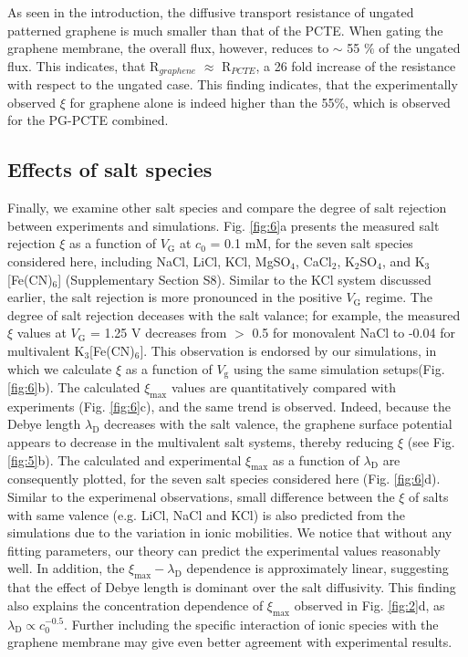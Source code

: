 \documentclass[journal=langd5,email=true, hyperref=true, keywords=false]{achemso}
\newcommand{\Fig}{Fig.}
\begin{document}
As seen in the introduction, the diffusive transport resistance of ungated patterned graphene 
is much smaller than that of the PCTE. When gating the graphene membrane,
the overall flux, however, reduces to $\sim$ 55 $\%$
of the ungated flux. This indicates, that R$_{graphene}$ $\approx$ R$_{PCTE}$, 
a 26 fold increase of the resistance with respect to the ungated case. 
This finding indicates, that the experimentally observed $\xi$ for graphene alone 
is indeed higher than the 55$\%$, which is observed for the PG-PCTE combined.

\subsection{Effects of salt species}
\label{sec:salts}

Finally, we examine other salt species and compare the degree of salt
rejection between experiments and simulations. \Fig{} \ref{fig:6}a
presents the measured salt rejection $\xi$ as a function of
$V_{\mathrm{G}}$ at $c_{0}$ = 0.1 mM, for the seven salt species
considered here, including NaCl, LiCl, KCl, MgSO$_{4}$, CaCl$_{2}$,
K$_{2}$SO$_{4}$, and K$_{3}$[Fe(CN)$_{6}$] (Supplementary Section
S8). Similar to the KCl system discussed earlier, the salt rejection
is more pronounced in the positive $V_{\mathrm{G}}$ regime. The degree
of salt rejection deceases with the salt valance; for example, the
measured $\xi$ values at $V_{\mathrm{G}}$ = 1.25 V decreases from $>$
0.5 for monovalent NaCl to -0.04 for multivalent
K$_{3}$[Fe(CN)$_{6}$]. This observation is endorsed by our
simulations, in which we calculate $\xi$ as a function of
$V_{\mathrm{g}}$ using the same simulation setups(\Fig{}
\ref{fig:6}b). The calculated $\xi_{\mathrm{max}}$ values are
quantitatively compared with experiments (\Fig{} \ref{fig:6}c), and
the same trend is observed. Indeed, because the Debye length
$\lambda_{\mathrm{D}}$ decreases with the salt valence, the graphene
surface potential appears to decrease in the multivalent salt systems,
thereby reducing $\xi$ (see \Fig{} \ref{fig:5}b). The calculated and
experimental $\xi_{\mathrm{max}}$ as a function of
$\lambda_{\mathrm{D}}$ are consequently plotted, for the seven salt
species considered here (\Fig{} \ref{fig:6}d). Similar to the
experimenal observations, small difference between the $\xi$ of salts
with same valence (e.g. LiCl, NaCl and KCl) is also predicted from the
simulations due to the variation in ionic mobilities. We notice that
without any fitting parameters, our theory can predict the
experimental values reasonably well.  In addition, the
$\xi_{\mathrm{max}}-\lambda_{\mathrm{D}}$ dependence is approximately
linear, suggesting that the effect of Debye length is dominant over
the salt diffusivity. This finding also explains the concentration
dependence of $\xi_{\mathrm{max}}$ observed in \Fig{} \ref{fig:2}d, as
$\lambda_{\mathrm{D}} \propto c_{0}^{-0.5}$. Further including the
specific interaction of ionic species with the graphene membrane
\cite{Ghosh_2018} may give even better agreement with experimental
results.
\end{document}
